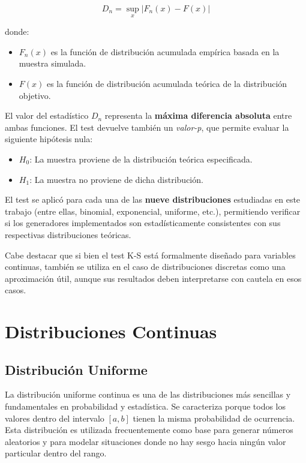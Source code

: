 \documentclass{article}
\begin{document}
\[
D_n = \sup_x \left| F_n(x) - F(x) \right|
\]

donde:
\begin{itemize}
    \item \( F_n(x) \) es la función de distribución acumulada empírica basada en la muestra simulada.
    \item \( F(x) \) es la función de distribución acumulada teórica de la distribución objetivo.
\end{itemize}

El valor del estadístico \( D_n \) representa la \textbf{máxima diferencia absoluta} entre ambas funciones. El test devuelve también un \emph{valor-p}, que permite evaluar la siguiente hipótesis nula:

\begin{itemize}
    \item \( H_0 \): La muestra proviene de la distribución teórica especificada.
    \item \( H_1 \): La muestra no proviene de dicha distribución.
\end{itemize}

El test se aplicó para cada una de las \textbf{nueve distribuciones} estudiadas en este trabajo (entre ellas, binomial, exponencial, uniforme, etc.), permitiendo verificar si los generadores implementados son estadísticamente consistentes con sus respectivas distribuciones teóricas.

Cabe destacar que si bien el test K-S está formalmente diseñado para variables continuas, también se utiliza en el caso de distribuciones discretas como una aproximación útil, aunque sus resultados deben interpretarse con cautela en esos casos.


\section{Distribuciones Continuas}

\subsection{Distribución Uniforme}
La distribución uniforme continua es una de las distribuciones más sencillas y fundamentales en probabilidad y estadística. Se caracteriza porque todos los valores dentro del intervalo $[a, b]$ tienen la misma probabilidad de ocurrencia. Esta distribución es utilizada frecuentemente como base para generar números aleatorios y para modelar situaciones donde no hay sesgo hacia ningún valor particular dentro del rango.
\end{document}

